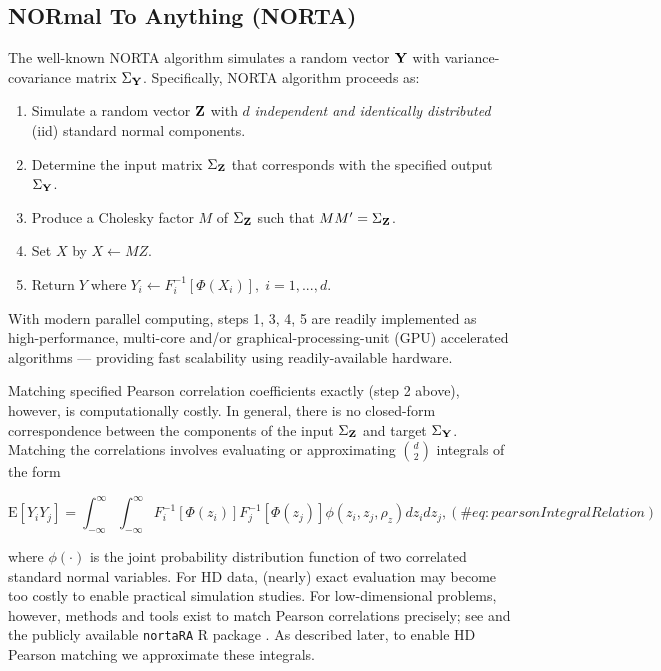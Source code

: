 \documentclass[
]{jss}
\providecommand{\tightlist}{%
  \setlength{\itemsep}{0pt}\setlength{\parskip}{0pt}}
\begin{document}
\hypertarget{normal-to-anything-norta}{%
\subsection{NORmal To Anything (NORTA)}\label{normal-to-anything-norta}}

The well-known NORTA algorithm \citep{Cario1997} simulates a random
vector \(\bf Y\) with variance-covariance matrix \(\Sigma_{\bf Y}\).
Specifically, NORTA algorithm proceeds as:


\begin{enumerate}
\def\labelenumi{\arabic{enumi}.}
\tightlist
\item
  Simulate a random vector \(\bf Z\) with \(d\) \emph{independent and
  identically distributed} (iid) standard normal components.
\item
  Determine the input matrix \(\Sigma_{\bf Z}\) that corresponds with
  the specified output \(\Sigma_{\bf Y}\).
\item
  Produce a Cholesky factor \(M\) of \(\Sigma_{\bf Z}\) such that
  \(M M^{\prime}=\Sigma_{\bf Z}\).
\item
  Set \(X\) by \(X \gets MZ\).
\item
  \(\text{Return} \; Y \; \text{where} \; Y_i \gets F_i^{-1}[\Phi(X_i)], \; i=1,...,d\).
\end{enumerate}


With modern parallel computing, steps 1, 3, 4, 5 are readily implemented
as high-performance, multi-core and/or graphical-processing-unit (GPU)
accelerated algorithms --- providing fast scalability using
readily-available hardware.

Matching specified Pearson correlation coefficients exactly (step 2
above), however, is computationally costly. In general, there is no
closed-form correspondence between the components of the input
\(\Sigma_{\bf Z}\) and target \(\Sigma_{\bf Y}\). Matching the
correlations involves evaluating or approximating \(\binom{d}{2}\)
integrals of the form

\begin{equation}
    \mathrm{E}\left[Y_i Y_j\right] = \int_{-\infty}^{\infty} \int_{-\infty}^{\infty} F_i^{-1}\left[\Phi(z_i)\right] F_j^{-1}\left[\Phi(z_j)\right] \phi(z_i, z_j, \rho_z) dz_i dz_j,
    (\#eq:pearsonIntegralRelation)
\end{equation}

where \(\phi(\cdot)\) is the joint probability distribution function of
two correlated standard normal variables. For HD data, (nearly) exact
evaluation may become too costly to enable practical simulation studies.
For low-dimensional problems, however, methods and tools exist to match
Pearson correlations precisely; see \citep{Xia17} and the publicly
available \texttt{nortaRA} R package \citep{Chen2001}. As described
later, to enable HD Pearson matching we approximate these integrals.
\end{document}
